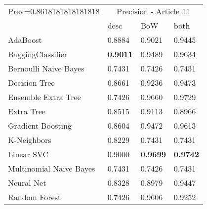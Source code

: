 \begin{tabular}{|l|l|l|l| }
\hline
Prev=0.8618181818181818 &  \multicolumn{3}{c|}{Precision - Article 11} \\
\cline{2-4} & desc & BoW & both \\ \hline
AdaBoost                & 0.8884 & 0.9021 & 0.9445\\
BaggingClassifier       & {\bf 0.9011} & 0.9489 & 0.9634\\
Bernoulli Naive Bayes   & 0.7431 & 0.7426 & 0.7431\\
Decision Tree           & 0.8661 & 0.9236 & 0.9473\\
Ensemble Extra Tree     & 0.7426 & 0.9660 & 0.9729\\
Extra Tree              & 0.8515 & 0.9113 & 0.8966\\
Gradient Boosting       & 0.8604 & 0.9472 & 0.9613\\
K-Neighbors             & 0.8229 & 0.7431 & 0.7431\\
Linear SVC              & 0.9000 & {\bf 0.9699} & {\bf 0.9742}\\
Multinomial Naive Bayes & 0.7431 & 0.7426 & 0.7431\\
Neural Net              & 0.8328 & 0.8979 & 0.9447\\
Random Forest           & 0.7426 & 0.9606 & 0.9252\\
\hline
\end{tabular}